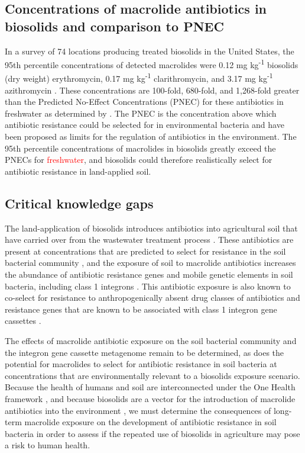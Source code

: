 \subsection{Concentrations of macrolide antibiotics in biosolids and comparison to PNEC}

In a survey of 74 locations producing treated biosolids in the United States, the 95th percentile concentrations of detected macrolides were 0.12 mg kg\textsuperscript{-1} biosolids (dry weight) erythromycin, 0.17 mg kg\textsuperscript{-1} clarithromycin, and 3.17 mg kg\textsuperscript{-1} azithromycin \parencite{U.S.EnvironmentalProtectionAgency.2021}.
These concentrations are 100-fold, 680-fold, and 1,268-fold greater than the Predicted No-Effect Concentrations (PNEC) for these antibiotics in freshwater as determined by \cite{BengtssonPalme.2016}.
The PNEC is the concentration above which antibiotic resistance could be selected for in environmental bacteria and have been proposed as limits for the regulation of antibiotics in the environment.
The 95th percentile concentrations of macrolides in biosolids greatly exceed the PNECs for \textcolor{red}{freshwater}, and biosolids could therefore realistically select for antibiotic resistance in land-applied soil.

\subsection{Critical knowledge gaps}

The land-application of biosolids introduces antibiotics into agricultural soil that have carried over from the wastewater treatment process \parencite{McClellan.2010, Sabourin.2012}.
These antibiotics are present at concentrations that are predicted to select for resistance in the soil bacterial community \parencite{U.S.EnvironmentalProtectionAgency.2021, BengtssonPalme.2016}, and the exposure of soil to macrolide antibiotics increases the abundance of antibiotic resistance genes and mobile genetic elements in soil bacteria, including class 1 integrons \parencite{Lau.2020}.
This antibiotic exposure is also known to co-select for resistance to anthropogenically absent drug classes of antibiotics and resistance genes that are known to be associated with class 1 integron gene cassettes \parencite{Lau.2020}.

The effects of macrolide antibiotic exposure on the soil bacterial community and the integron gene cassette metagenome remain to be determined, as does the potential for macrolides to select for antibiotic resistance in soil bacteria at concentrations that are environmentally relevant to a biosolids exposure scenario.
Because the health of humans and soil are interconnected under the One Health framework \parencite{Tiedje.2019}, and because biosolids are a vector for the introduction of macrolide antibiotics into the environment \parencite{Sabourin.2012, McClellan.2010}, we must determine the consequences of long-term macrolide exposure on the development of antibiotic resistance in soil bacteria in order to assess if the repeated use of biosolids in agriculture may pose a risk to human health.

